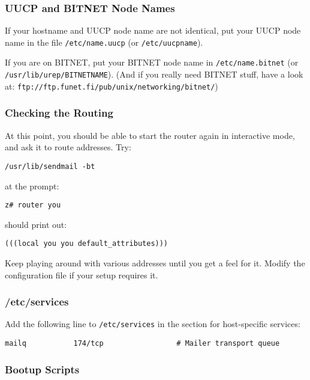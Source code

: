 \subsubsection{UUCP and BITNET Node Names}

If your hostname and UUCP node name are not identical, put your
UUCP node name in the file {\tt /etc/name.uucp} (or {\tt /etc/uucpname}).

If you are on BITNET, put your BITNET node name in {\tt /etc/name.bitnet}
(or {\tt /usr/lib/urep/BITNETNAME}). (And if you really need BITNET stuff, have a look at:
{\tt ftp://ftp.funet.fi/pub/unix/networking/bitnet/})




\subsubsection{Checking the Routing}

At this point, you should be able to start the router again in
interactive mode, and ask it to route addresses.  Try:
\begin{verbatim}
/usr/lib/sendmail -bt
\end{verbatim}

at the prompt:
\begin{verbatim}
z# router you
\end{verbatim}

should print out:
\begin{verbatim}
(((local you you default_attributes)))
\end{verbatim}


Keep playing around with various addresses until you get a feel for it.
Modify the configuration file if your setup requires it.




\subsubsection{/etc/services}

Add the following line to {\tt /etc/services} in the section for
host-specific services:
\begin{verbatim}
mailq           174/tcp                 # Mailer transport queue
\end{verbatim}





\subsubsection{Bootup Scripts}

